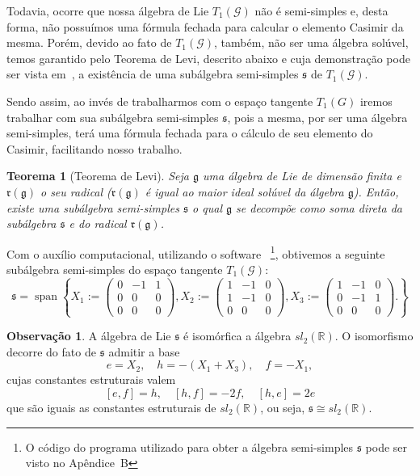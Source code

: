 \documentclass[twoside,openright,titlepage,numbers=noenddot,headinclude,  lineheaders footinclude=true,cleardoublepage=empty,
                                BCOR=5mm,paper=a4,fontsize=12pt ]{scrbook}
\newtheorem{teo}{Teorema}[chapter]
\theoremstyle{definition}
\newtheorem*{obs*}{Observação}
\DeclareMathOperator{\spn}{span}
\begin{document}
Todavia, ocorre que nossa álgebra de Lie $T_1(\mathcal{G})$ não é semi-simples e, desta
forma, não possuímos uma fórmula fechada para calcular o elemento Casimir da mesma. Porém, devido ao
fato de $T_1(\mathcal{G})$, também, não ser uma álgebra solúvel, temos garantido pelo
Teorema de Levi, descrito abaixo e cuja demonstração pode ser vista em~\cite{algebra},
a existência  de uma subálgebra semi-simples $\mathfrak{s}$ de $T_1(\mathcal{G})$. 

Sendo assim, ao invés de trabalharmos com o espaço tangente $T_1(G)$ iremos trabalhar com sua
subálgebra semi-simples $\mathfrak{s}$, pois a mesma, por ser uma álgebra semi-simples, 
terá uma fórmula fechada para o cálculo de seu elemento do Casimir,
facilitando nosso trabalho.
\begin{teo}[Teorema de Levi]
Seja $\mathfrak{g}$ uma álgebra de Lie de dimensão finita e $\mathfrak{r}(\mathfrak{g})$ o seu radical
($\mathfrak{r}(\mathfrak{g})$ é igual ao maior ideal solúvel da álgebra $\mathfrak{g}$).
Então, existe uma subálgebra semi-simples $\mathfrak{s}$ o qual $\mathfrak{g}$ se decompõe como soma
direta da subálgebra $\mathfrak{s}$ e do radical $\mathfrak{r}(\mathfrak{g})$. 
\end{teo}

Com o auxílio computacional, utilizando o software~\cite{octave}
 \footnote{O código do programa utilizado para obter a álgebra semi-simples $\mathfrak{s}$ pode ser
visto no Apêndice~B}, obtivemos a seguinte subálgebra
semi-simples do espaço tangente $T_1(\mathcal{G})$:
\[ \mathfrak{s} = \spn \left\{
X_1:=
\begin{pmatrix}
0 & -1 & 1 \\
0 & 0 & 0 \\
0 & 0 & 0 
\end{pmatrix}
,
X_2:=
\begin{pmatrix}
1 & -1 & 0 \\
1 & -1& 0 \\
0 & 0 & 0 
\end{pmatrix}
,
X_3:=
\begin{pmatrix}
1 & -1 & 0 \\
0 & -1& 1 \\
0 & 0 & 0 
\end{pmatrix}
.
\right\}
\]

\begin{obs*}
A álgebra de Lie $\mathfrak{s}$ é isomórfica a álgebra $sl_2(\mathbb{R})$. O isomorfismo decorre do 
fato de $\mathfrak{s}$ admitir a base
\[
e = X_2, \quad h = -(X_1 + X_3), \quad f = -X_1,
\]
cujas constantes estruturais valem
\[
[e,f] = h, \quad [h,f] = -2f, \quad [h,e] = 2e
\]
que são iguais as constantes estruturais de $sl_2(\mathbb{R})$, ou seja,
$\mathfrak{s} \cong sl_2(\mathbb{R})$.
\end{obs*}
\end{document}
